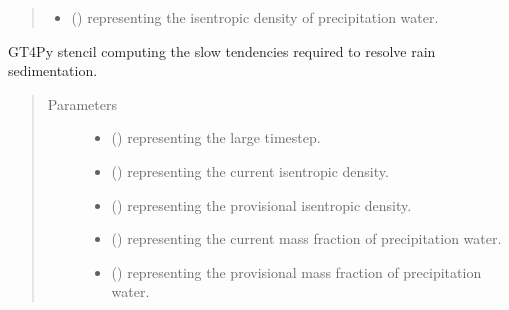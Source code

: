 \documentclass[letterpaper,10pt,english]{sphinxmanual}
\begin{document}
\begin{fulllineitems}
\begin{fulllineitems}
\begin{quote}
\begin{description}
\begin{itemize}
\item {} 
 () \textendash{}  representing the isentropic density of precipitation water.

\end{itemize}


\end{description}\end{quote}

\end{fulllineitems}


\begin{fulllineitems}
\label{\detokenize{api:dycore.prognostic_isentropic_forward_euler.PrognosticIsentropicForwardEuler._stencil_computing_slow_tendencies_defs}}
GT4Py stencil computing the slow tendencies required to resolve rain sedimentation.
\begin{quote}\begin{description}
\item[{Parameters}] \leavevmode\begin{itemize}
\item {} 
 () \textendash{}  representing the large timestep.

\item {} 
 () \textendash{}  representing the current isentropic density.

\item {} 
 () \textendash{}  representing the provisional isentropic density.

\item {} 
 () \textendash{}  representing the current mass fraction of precipitation water.

\item {} 
 () \textendash{}  representing the provisional mass fraction of precipitation water.


\end{itemize}
\end{description}
\end{quote}
\end{fulllineitems}
\end{fulllineitems}
\end{document}
